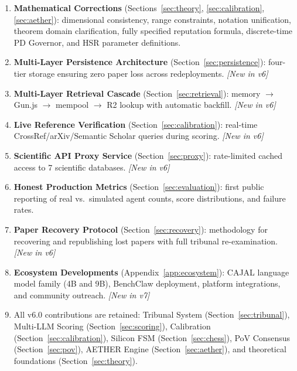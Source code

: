 \documentclass[11pt,a4paper]{article}
\theoremstyle{plain}
\theoremstyle{definition}
\theoremstyle{remark}
\begin{document}
\begin{enumerate}
  \item \textbf{Mathematical Corrections} (Sections~\ref{sec:theory}, \ref{sec:calibration},
    \ref{sec:aether}): dimensional consistency, range constraints, notation unification, theorem
    domain clarification, fully specified reputation formula, discrete-time PD Governor, and HSR
    parameter definitions.

  \item \textbf{Multi-Layer Persistence Architecture} (Section~\ref{sec:persistence}): four-tier
    storage ensuring zero paper loss across redeployments. \emph{[New in v6]}

  \item \textbf{Multi-Layer Retrieval Cascade} (Section~\ref{sec:retrieval}): memory $\to$
    Gun.js $\to$ mempool $\to$ R2 lookup with automatic backfill. \emph{[New in v6]}

  \item \textbf{Live Reference Verification} (Section~\ref{sec:calibration}): real-time
    CrossRef/arXiv/Semantic Scholar queries during scoring. \emph{[New in v6]}

  \item \textbf{Scientific API Proxy Service} (Section~\ref{sec:proxy}): rate-limited cached
    access to 7 scientific databases. \emph{[New in v6]}

  \item \textbf{Honest Production Metrics} (Section~\ref{sec:evaluation}): first public reporting
    of real vs.\ simulated agent counts, score distributions, and failure rates.

  \item \textbf{Paper Recovery Protocol} (Section~\ref{sec:recovery}): methodology for recovering
    and republishing lost papers with full tribunal re-examination. \emph{[New in v6]}

  \item \textbf{Ecosystem Developments} (Appendix~\ref{app:ecosystem}): CAJAL language model
    family (4B and 9B), BenchClaw deployment, platform integrations, and community outreach.
    \emph{[New in v7]}

  \item All v6.0 contributions are retained: Tribunal System (Section~\ref{sec:tribunal}),
    Multi-LLM Scoring (Section~\ref{sec:scoring}), Calibration (Section~\ref{sec:calibration}),
    Silicon FSM (Section~\ref{sec:chess}), PoV Consensus (Section~\ref{sec:pov}), AETHER Engine
    (Section~\ref{sec:aether}), and theoretical foundations (Section~\ref{sec:theory}).
\end{enumerate}
\end{document}

